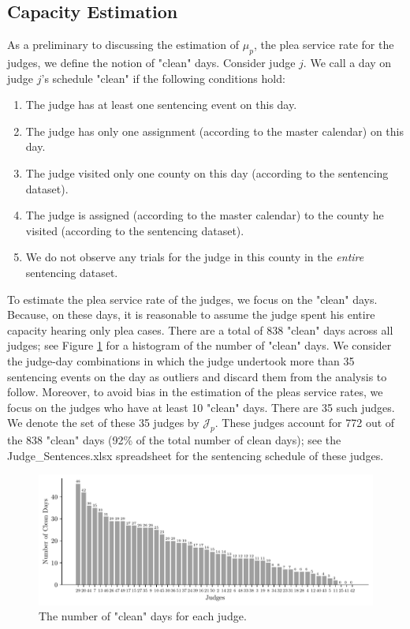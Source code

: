 \documentclass[11pt, oneside]{article}   	%
\theoremstyle{ModifiedStyle}
\begin{document}
\subsection{Capacity Estimation}
\label{Sec:Capacity_Estimation}

As a preliminary to discussing the estimation of $\mu_p$, the plea service rate for the judges, we define the notion of "clean" days. Consider judge $j$. We call a day on judge $j$'s schedule "clean" if the following conditions hold:
\begin{enumerate}[label=(\roman*)]
	\vspace{-2mm}
	\item The judge has at least one sentencing event on this day.
	\item The judge has only one assignment (according to the master calendar) on this day.
	\item The judge visited only one county on this day (according to the sentencing dataset).
	\item The judge is assigned (according to the master calendar) to the county he visited (according to the sentencing dataset).
	\item We do not observe any trials for the judge in this county in the \emph{entire} sentencing dataset.
\end{enumerate}
\vspace{-1mm}
To estimate the plea service rate of the judges, we focus on the "clean" days. Because, on these days, it is reasonable to assume the judge spent his entire capacity hearing only plea cases. There are a total of $838$ "clean" days across all judges; see Figure \ref{Figure_Judge_Clean_Days_Histogram} for a histogram of the number of "clean" days. We consider the judge-day combinations in which the judge undertook more than 35 sentencing events on the day as outliers and discard them from the analysis to follow. Moreover, to avoid bias in the estimation of the pleas service rates, we focus on the judges who have at least 10 "clean" days. There are 35 such judges. We denote the set of these 35 judges by $\mathcal{J}_p$. These judges account for 772 out of the 838 "clean" days (92\% of the total number of clean days); see the Judge\_Sentences.xlsx spreadsheet for the sentencing schedule of these judges.
%
\begin{figure}[H]
	\centering
	\includegraphics[scale=0.75]{Figures/Judge_Clean_Days_Histogram}
	\vspace{-3mm}
	\caption{The number of "clean" days for each judge.}
	\label{Figure_Judge_Clean_Days_Histogram}
\end{figure}
\end{document}
